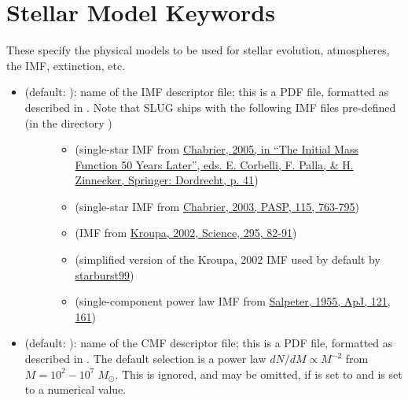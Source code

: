 \documentclass[letterpaper,10pt,english]{sphinxmanual}
\begin{document}
\section{Stellar Model Keywords}
\label{parameters:stellar-model-keywords}\label{parameters:ssec-stellar-keywords}
These specify the physical models to be used for stellar evolution, atmospheres, the IMF, extinction, etc.
\begin{itemize}
\item {} \begin{description}
\item[{ (default: ): name of the IMF descriptor file; this is a PDF file, formatted as described in {\hyperref[pdfs:sec-pdfs]{\emph{}}}. Note that SLUG ships with the following IMF files pre-defined (in the directory )}] \leavevmode\begin{itemize}
\item {} 
 (single-star IMF from \href{http://adsabs.harvard.edu/abs/2005ASSL..327...41C}{Chabrier, 2005, in ``The Initial Mass Function 50 Years Later'', eds. E. Corbelli, F. Palla, \& H. Zinnecker, Springer: Dordrecht, p. 41})

\item {} 
 (single-star IMF from \href{http://adsabs.harvard.edu/abs/2003PASP..115..763C}{Chabrier, 2003, PASP, 115, 763-795})

\item {} 
 (IMF from \href{http://adsabs.harvard.edu/abs/2002Sci...295...82K}{Kroupa, 2002, Science, 295, 82-91})

\item {} 
 (simplified version of the Kroupa, 2002 IMF used by default by \href{http://www.stsci.edu/science/starburst99/docs/default.htm}{starburst99})

\item {} 
 (single-component power law IMF from \href{http://adsabs.harvard.edu/abs/1955ApJ...121..161S}{Salpeter, 1955, ApJ, 121, 161})

\end{itemize}

\end{description}

\item {} 
 (default: ): name of the CMF descriptor file; this is a PDF file, formatted as described in {\hyperref[pdfs:sec-pdfs]{\emph{}}}. The default selection is a power law \(dN/dM \propto M^{-2}\) from \(M = 10^2 - 10^7\;M_\odot\). This is ignored, and may be omitted, if  is set to  and  is set to a numerical value.


\end{itemize}
\end{document}
